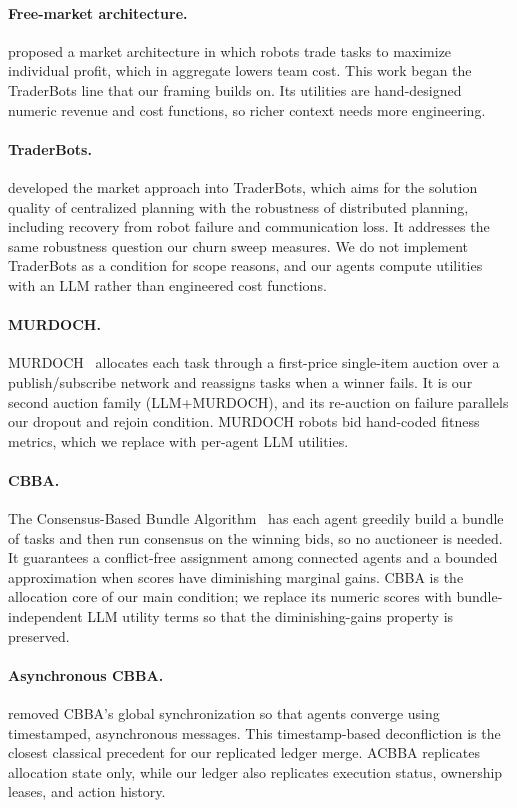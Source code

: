 \documentclass[letterpaper]{article}
\begin{document}
\paragraph{Free-market architecture.}
\citet{dias2000free} proposed a market architecture in which robots trade tasks to maximize individual profit, which in aggregate lowers team cost. This work began the TraderBots line that our framing builds on. Its utilities are hand-designed numeric revenue and cost functions, so richer context needs more engineering.

\paragraph{TraderBots.}
\citet{dias2004traderbots} developed the market approach into TraderBots, which aims for the solution quality of centralized planning with the robustness of distributed planning, including recovery from robot failure and communication loss. It addresses the same robustness question our churn sweep measures. We do not implement TraderBots as a condition for scope reasons, and our agents compute utilities with an LLM rather than engineered cost functions.

\paragraph{MURDOCH.}
MURDOCH~\citep{gerkey2002sold} allocates each task through a first-price single-item auction over a publish/subscribe network and reassigns tasks when a winner fails. It is our second auction family (LLM+MURDOCH), and its re-auction on failure parallels our dropout and rejoin condition. MURDOCH robots bid hand-coded fitness metrics, which we replace with per-agent LLM utilities.

\paragraph{CBBA.}
The Consensus-Based Bundle Algorithm~\citep{choi2009cbba} has each agent greedily build a bundle of tasks and then run consensus on the winning bids, so no auctioneer is needed. It guarantees a conflict-free assignment among connected agents and a bounded approximation when scores have diminishing marginal gains. CBBA is the allocation core of our main condition; we replace its numeric scores with bundle-independent LLM utility terms so that the diminishing-gains property is preserved.

\paragraph{Asynchronous CBBA.}
\citet{johnson2011acbba} removed CBBA's global synchronization so that agents converge using timestamped, asynchronous messages. This timestamp-based deconfliction is the closest classical precedent for our replicated ledger merge. ACBBA replicates allocation state only, while our ledger also replicates execution status, ownership leases, and action history.
\end{document}
